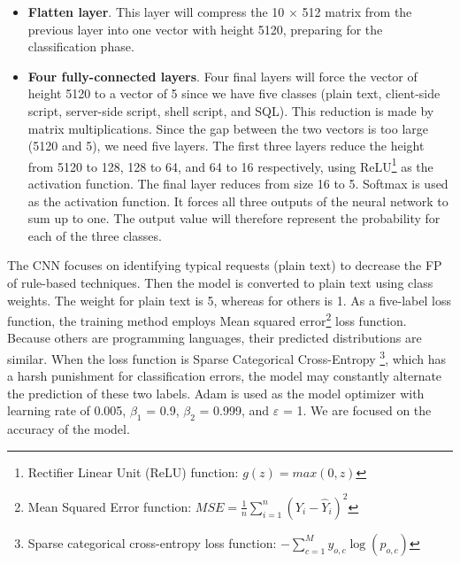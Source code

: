 \begin{itemize}
	\item \textbf{Flatten layer}. This layer will compress the 10 $\times$ 512 matrix from the previous layer into one vector with height 5120, preparing for the classification phase. 
	\item \textbf{Four fully-connected layers}. Four final layers will force the vector of height 5120 to a vector of 5 since we have five classes (plain text, client-side script, server-side script, shell script, and SQL). This reduction is made by matrix multiplications. Since the gap between the two vectors is too large (5120 and 5), we need five layers. The first three layers reduce the height from 5120 to 128, 128 to 64, and 64 to 16 respectively, using ReLU\footnote{
		Rectifier Linear Unit (ReLU) function: $g(z) = max(0, z)$
	} as the activation function. The final layer reduces from size 16 to 5. Softmax is used as the activation function. It forces all three outputs of the neural network to sum up to one. The output value will therefore represent the probability for each of the three classes.
\end{itemize}
\hspace{0.5cm}The CNN focuses on identifying typical requests (plain text) to decrease the FP of rule-based techniques. Then the model is converted to plain text using class weights. The weight for plain text is 5, whereas for others is 1. As a five-label loss function, the training method employs Mean squared error\footnote{
	Mean Squared Error function: $MSE = \frac{1}{n}\sum_{i=1}^{n}(Y_i-\widehat{Y}_i)^2$
} loss function. Because others are programming languages, their predicted distributions are similar. When the loss function is Sparse Categorical Cross-Entropy\hspace{-0.15cm}
\footnote{
	Sparse categorical cross-entropy loss function: $-\sum_{c=1}^My_{o,c}\log(p_{o,c})$
}, which has a harsh punishment for classification errors, the model may constantly alternate the prediction of these two labels. Adam is used as the model optimizer with learning rate of 0.005, $\beta_1$ = 0.9, $\beta_2$ = 0.999, and $\varepsilon$ = 1. We are focused on the accuracy of the model.

